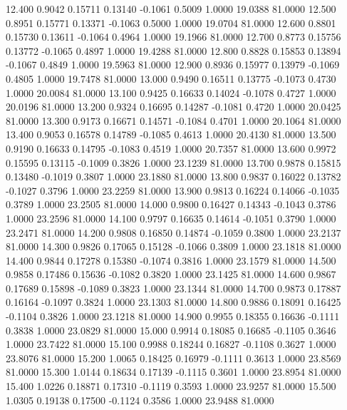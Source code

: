   12.400   0.9042   0.15711   0.13140  -0.1061   0.5009   1.0000  19.0388  81.0000
  12.500   0.8951   0.15771   0.13371  -0.1063   0.5000   1.0000  19.0704  81.0000
  12.600   0.8801   0.15730   0.13611  -0.1064   0.4964   1.0000  19.1966  81.0000
  12.700   0.8773   0.15756   0.13772  -0.1065   0.4897   1.0000  19.4288  81.0000
  12.800   0.8828   0.15853   0.13894  -0.1067   0.4849   1.0000  19.5963  81.0000
  12.900   0.8936   0.15977   0.13979  -0.1069   0.4805   1.0000  19.7478  81.0000
  13.000   0.9490   0.16511   0.13775  -0.1073   0.4730   1.0000  20.0084  81.0000
  13.100   0.9425   0.16633   0.14024  -0.1078   0.4727   1.0000  20.0196  81.0000
  13.200   0.9324   0.16695   0.14287  -0.1081   0.4720   1.0000  20.0425  81.0000
  13.300   0.9173   0.16671   0.14571  -0.1084   0.4701   1.0000  20.1064  81.0000
  13.400   0.9053   0.16578   0.14789  -0.1085   0.4613   1.0000  20.4130  81.0000
  13.500   0.9190   0.16633   0.14795  -0.1083   0.4519   1.0000  20.7357  81.0000
  13.600   0.9972   0.15595   0.13115  -0.1009   0.3826   1.0000  23.1239  81.0000
  13.700   0.9878   0.15815   0.13480  -0.1019   0.3807   1.0000  23.1880  81.0000
  13.800   0.9837   0.16022   0.13782  -0.1027   0.3796   1.0000  23.2259  81.0000
  13.900   0.9813   0.16224   0.14066  -0.1035   0.3789   1.0000  23.2505  81.0000
  14.000   0.9800   0.16427   0.14343  -0.1043   0.3786   1.0000  23.2596  81.0000
  14.100   0.9797   0.16635   0.14614  -0.1051   0.3790   1.0000  23.2471  81.0000
  14.200   0.9808   0.16850   0.14874  -0.1059   0.3800   1.0000  23.2137  81.0000
  14.300   0.9826   0.17065   0.15128  -0.1066   0.3809   1.0000  23.1818  81.0000
  14.400   0.9844   0.17278   0.15380  -0.1074   0.3816   1.0000  23.1579  81.0000
  14.500   0.9858   0.17486   0.15636  -0.1082   0.3820   1.0000  23.1425  81.0000
  14.600   0.9867   0.17689   0.15898  -0.1089   0.3823   1.0000  23.1344  81.0000
  14.700   0.9873   0.17887   0.16164  -0.1097   0.3824   1.0000  23.1303  81.0000
  14.800   0.9886   0.18091   0.16425  -0.1104   0.3826   1.0000  23.1218  81.0000
  14.900   0.9955   0.18355   0.16636  -0.1111   0.3838   1.0000  23.0829  81.0000
  15.000   0.9914   0.18085   0.16685  -0.1105   0.3646   1.0000  23.7422  81.0000
  15.100   0.9988   0.18244   0.16827  -0.1108   0.3627   1.0000  23.8076  81.0000
  15.200   1.0065   0.18425   0.16979  -0.1111   0.3613   1.0000  23.8569  81.0000
  15.300   1.0144   0.18634   0.17139  -0.1115   0.3601   1.0000  23.8954  81.0000
  15.400   1.0226   0.18871   0.17310  -0.1119   0.3593   1.0000  23.9257  81.0000
  15.500   1.0305   0.19138   0.17500  -0.1124   0.3586   1.0000  23.9488  81.0000
